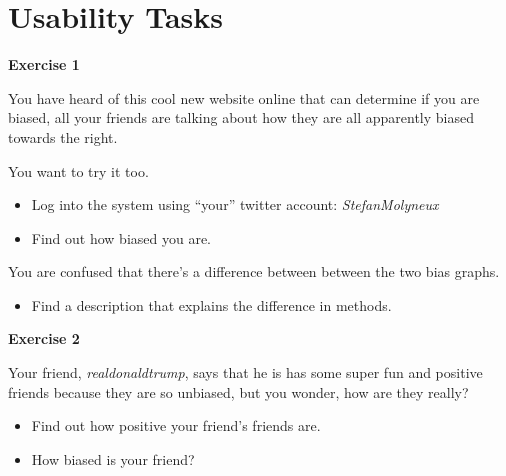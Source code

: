 \chapter{Usability Tasks}\label{app:UXTasks}

\textbf{Exercise 1}\nl

You have heard of this cool new website online that can determine if you are
biased, all your friends are talking about how they are all apparently biased
towards the right.\nl

You want to try it too.

\begin{itemize}
  \item Log into the system using “your” twitter account:
  \textit{StefanMolyneux}
  \item Find out how biased you are.
\end{itemize}

You are confused that there’s a difference between between the two bias graphs.

\begin{itemize}
  \item Find a description that explains the difference in methods.
\end{itemize}

\textbf{Exercise 2}\nl

Your friend, \textit{realdonaldtrump}, says that he is has some super fun and
positive friends because they are so unbiased, but you wonder, how are they
really?


\begin{itemize}
  \item Find out how positive your friend’s friends are.
  \item How biased is your friend?
\end{itemize}
